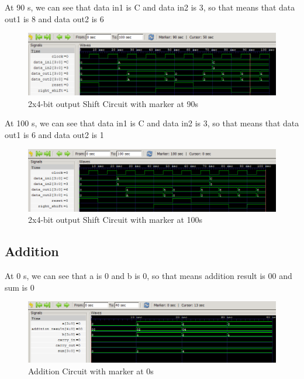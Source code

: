\documentclass[12pt]{article}
\begin{document}
At 90 s, we can see that data in1 is C and data in2 is 3, so that means that data out1 is 8 and data out2 is 6
\begin{figure}[h]
    \centering
    \includegraphics[width = 1.0\textwidth]{figs/Shift90.png}
    \caption{2x4-bit output Shift Circuit with marker at 90s}
    \label{fig:enter-label}
\end{figure}

At 100 s, we can see that data in1 is C and data in2 is 3, so that means that data out1 is 6 and data out2 is 1
\begin{figure}[h]
    \centering
    \includegraphics[width = 1.0\textwidth]{figs/Shift100.png}
    \caption{2x4-bit output Shift Circuit with marker at 100s}
    \label{fig:enter-label}
\end{figure}

\newpage


\subsection{Addition}

At 0 s, we can see that a is 0 and b is 0, so that means addition result is 00 and sum is 0
\begin{figure}[h]
    \centering
    \includegraphics[width = 1.0\textwidth]{figs/Add0.png}
    \caption{Addition Circuit with marker at 0s}
    \label{fig:enter-label}
\end{figure}
\end{document}
